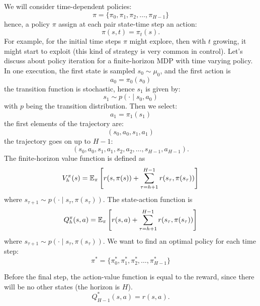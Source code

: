 \documentclass[10pt, a4paper]{report}
\begin{document}
We will consider time-dependent policies:\begin{equation}
    \pi=\{\pi_0,\pi_1,\pi_2,\dots,\pi_{H-1}\}
\end{equation}
hence, a policy $\pi$ assign at each pair state-time step an action:\begin{equation}
    \pi(s,t)=\pi_t(s).
\end{equation}
For example, for the initial time steps $\pi$ might explore, then with $t$ growing, it might start to exploit (this kind of strategy is very common in control). Let's discuss about policy iteration for a finite-horizon MDP with time varying policy. In one execution, the first state is sampled $s_0\sim\mu_0$, and the first action is\begin{equation}
    a_0=\pi_0(s_0)
\end{equation}
the transition function is stochastic, hence $s_1$ is given by:\begin{equation}
    s_1\sim p(\cdot\mid s_0,a_0)
\end{equation}
with $p$ being the transition distribution. Then we select:\begin{equation}
    a_1=\pi_1(s_1)
\end{equation}
the first elements of the trajectory are:\begin{equation}
    (s_0,a_0,s_1,a_1)
\end{equation}
the trajectory goes on up to $H-1$:\begin{equation}
     (s_0,a_0,s_1,a_1,s_2,a_2,\dots,s_{H-1},a_{H-1}).
\end{equation}
The finite-horizon value function is defined as\begin{equation}
    V_h^\pi(s)={\mathbb E}_\pi\left[
        r(s,\pi(s))+
        \sum_{\tau=h+1}^{H-1}r(s_\tau,\pi(s_\tau))
    \right]
\end{equation}
where  $s_{\tau+1}\sim p(\cdot\mid s_\tau,\pi(s_\tau))$. The state-action function is\begin{equation}\label{Q_h_pi}
    Q_h^\pi(s,a)={\mathbb E}_\pi\left[
        r(s,a)+
        \sum_{\tau=h+1}^{H-1}r(s_\tau,\pi(s_\tau))
    \right]
\end{equation}
where  $s_{\tau+1}\sim p(\cdot\mid s_\tau,\pi(s_\tau))$. We want to find an optimal policy for each time step:
\begin{equation}
    \pi^*=\{\pi^*_0,\pi^*_1,\pi^*_2,\dots,\pi^*_{H-1}\}
\end{equation}
\begin{boxobservation}
    Before the final step, the action-value function is equal to the reward, since there will be no other states (the horizon is $H$).\begin{equation}
        Q_{H-1}^*(s,a)=r(s,a).
    \end{equation}
\end{boxobservation}
\end{document}
